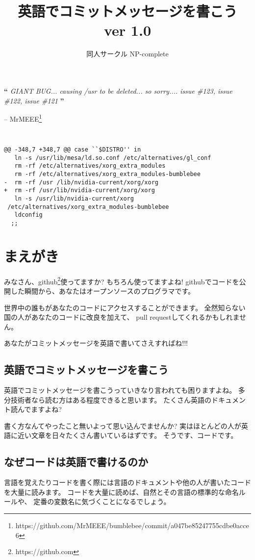 \documentclass{jarticle}
\title{英語でコミットメッセージを書こう\\ver 1.0}
\author{同人サークル NP-complete}
\date{}
\begin{document}
\maketitle
\newpage

{\bf {\Large ``} }
{\it GIANT BUG... causing /usr to be deleted... so sorry....
 issue \#123, issue \#122, issue \#121}
{\bf {\Large ''} }
\begin{flushright}
 -- MrMEEE\footnote{https://github.com/MrMEEE/bumblebee/commit/a047be85247755cdbe0acce6}
\end{flushright}

\vspace{1in}

{\tt
\begin{verbatim}
@@ -348,7 +348,7 @@ case ``$DISTRO'' in
   ln -s /usr/lib/mesa/ld.so.conf /etc/alternatives/gl_conf
   rm -rf /etc/alternatives/xorg_extra_modules
   rm -rf /etc/alternatives/xorg_extra_modules-bumblebee
-  rm -rf /usr /lib/nvidia-current/xorg/xorg
+  rm -rf /usr/lib/nvidia-current/xorg/xorg
   ln -s /usr/lib/nvidia-current/xorg
 /etc/alternatives/xorg_extra_modules-bumblebee
   ldconfig
  ;;

\end{verbatim}
}

\newpage
\section{まえがき}
みなさん、github\footnote{https://github.com}使ってますか?
もちろん使ってますよね!
githubでコードを公開した瞬間から、あなたはオープンソースのプログラマです。

世界中の誰もがあなたのコードにアクセスすることができます。
全然知らない国の人があなたのコードに改良を加えて、
pull requestしてくれるかもしれません。

あなたがコミットメッセージを英語で書いてさえすればね!!!

\subsection{英語でコミットメッセージを書こう}
英語でコミットメッセージを書こうっていきなり言われても困りますよね。
多分技術者なら読む方はある程度できると思います。
たくさん英語のドキュメント読んでますよね?

書く方なんてやったこと無いよって思い込んでませんか?
実はほとんどの人が英語に近い文章を日々たくさん書いているはずです。
そうです、コードです。

\subsection{なぜコードは英語で書けるのか}
言語を覚えたりコードを書く際には言語のドキュメントや他の人が書いたコード
を大量に読みます。
コードを大量に読めば、自然とその言語の標準的な命名ルールや、
定番の変数名に気づくことになるでしょう。
\end{document}
